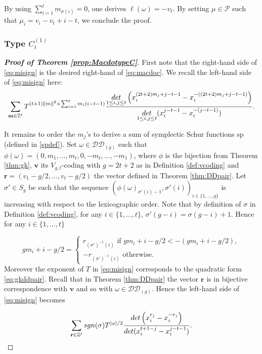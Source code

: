\documentclass[11pt,letterpaper]{amsart}
\def\bbbz{\mathbb Z}
\def\ccdd{\mathcal {DD}}
\def\ccp{\mathcal P}
\def\det{{\rm det}}
\def\sgn{{\rm sgn}}
\renewcommand{\sp}{\mathrm{sp}}
\numberwithin{equation}{section}
\numberwithin{df}{section}
\begin{document}
By using $\sum_{i=1}^t m_{\sigma(i)}=0$, one derives
$\ell(\omega)=-v_t$. By setting $\mu\in\ccp$ such that $\mu_i=v_i-v_t+i-t$, we conclude the proof. 


\subsubsection{Type $C^{(1)}_{t}$}


\begin{proof}[\textbf{Proof of Theorem \ref{prop:MacdotypeC}}]
First note that the right-hand side of \eqref{eq:misign} is the desired right-hand of \eqref{eq:macdoc}. We recall the left-hand side of \eqref{eq:misign} here:
\begin{multline}
\sum_{\mathbf{m}\in\bbbz^t}T^{(t+1)\lVert m\rVert^2+\sum_{i=1}^tm_i(i-t-1)}\frac{\underset{1\le i,j\le t}{\det}\left(x_i^{(2t+2)m_j+j-t-1}-x_i^{-((2t+2)m_j+j-t-1)}\right)}{\underset{1\le i,j\le t}{\det}(x_i^{j-t-1}-x_i^{-(j-t-1)})}.\label{eq:misignlhs}
\end{multline}


It remains to order the $m_j$'s to derive a sum of symplectic Schur functions $\sp$ (defined in \eqref{spdef}). Set $\omega\in\ccdd_{(g)}$ such that $\phi(\omega)=(0,m_1,\dots,m_t,0,-m_t,\dots,-m_1)$, where $\phi$ is the bijection from Theorem \ref{thm:gk}, $\mathbf{v}$ its $V_{g,t}$-coding with $g=2t+2$ as in Definition \ref{def:vcoding} and $\mathbf{r}=(v_1-g/2,\dots,v_t-g/2)$ the vector defined in Theorem \ref{thm:DDpair}. Let $\sigma'\in S_{g}$ be such that the sequence $(\phi(\omega)_{\sigma'(i)-1},\sigma'(i))_{i\in\lbrace 1,\dots,g\rbrace}$ is increasing with respect to the lexicographic order. Note that by definition of $\sigma$ in Definition \ref{def:vcoding}, for any $i\in\lbrace 1,\dots,t\rbrace$, $\sigma'(g-i)=\sigma(g-i)+1$. Hence for any $i\in\lbrace 1,\dots,t\rbrace$

$$gm_i+i-g/2=\begin{cases} r_{(\sigma')^{-1}(i)} \text{ if } gm_i+i-g/2<-(gm_i+i-g/2),\\
 -r_{(\sigma')^{-1}(i)} \text{ otherwise}.
 \end{cases}
$$
 Moreover the exponent of $T$ in \eqref{eq:misign} corresponds to the quadratic form \eqref{eq:gkddpair}. Recall that in Theorem \ref{thm:DDpair} the vector $\mathbf{r}$ is in bijective correspondence with $\mathbf{v}$ and so with $\omega\in\ccdd_{(g)}$. Hence the left-hand side of \eqref{eq:misign} becomes

\begin{equation*}
\sum_{\mathbf{r}\in\bbbz^t}\sgn(\sigma)T^{\lvert\omega\rvert/2}\frac{\det\left(x_i^{r_j}-x_i^{-r_j}\right)}{\det(x_i^{t+1-j}-x_i^{j-t-1})}.
\end{equation*}


\end{proof}
\end{document}
